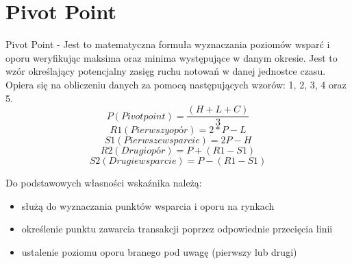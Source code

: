 \section{Pivot Point}
\label{sec:1PPV}

Pivot Point - Jest to matematyczna formuła wyznaczania poziomów wsparć i oporu weryfikując maksima oraz minima występujące w danym okresie. Jest to wzór określający potencjalny zasięg ruchu notowań w danej jednostce czasu. Opiera się na obliczeniu danych za pomocą następujących wzorów: 1, 2, 3, 4 oraz 5.
\begin{equation}
P(Pivot point) = \frac{(H + L + C)}{3}
\label{wzor_1}
\end{equation}
\begin{equation}
R1(Pierwszy opór) = 2*P - L
\label{wzor_2}
\end{equation}
\begin{equation}
S1 (Pierwsze wsparcie) = 2P - H
\label{wzor_3}
\end{equation}
\begin{equation}
R2 (Drugi opór) = P + (R1 - S1)
\label{wzor_4}
\end{equation}
\begin{equation}
S2 (Drugie wsparcie) = P - (R1 - S1)
\label{wzor_5}
\end{equation}


\noindent Do podstawowych własności wskaźnika należą:
\begin{itemize}
\item służą do wyznaczania punktów wsparcia i oporu na rynkach
\item określenie punktu zawarcia transakcji poprzez odpowiednie przecięcia linii
\item ustalenie poziomu oporu branego pod uwagę (pierwszy lub drugi)
\end{itemize}

